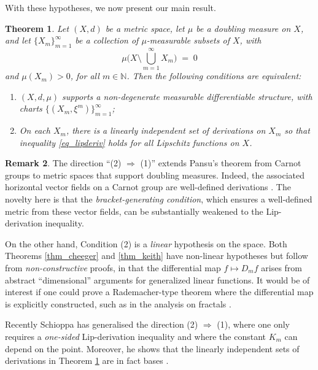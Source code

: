\documentclass[reqno]{amsart}
\theoremstyle{plain}
\newtheorem{thm}{Theorem}[section]
\theoremstyle{definition}
\newtheorem{rmk}[thm]{Remark}
\theoremstyle{remark}
\numberwithin{equation}{section}
\newcommand{\N}{\mathbb{N}}
\begin{document}
With these hypotheses, we now present our main result.

\begin{thm} \label{thm_doublingdiff}
Let $(X,d)$ be a metric space, let $\mu$ be a doubling measure on $X$, and let $\{X_m\}_{m=1}^\infty$ be a collection of $\mu$-measurable subsets of $X$, with
$$
\mu\Big( X \setminus \bigcup_{m=1}^\infty X_m \Big) \;=\; 0
$$
and $\mu(X_m) > 0$, for all $m \in \N$.
Then the following conditions are equivalent:
\begin{enumerate}
\item $(X,d,\mu)$ supports a non-degenerate measurable differentiable structure, with charts $\{(X_m,\xi^m)\}_{m=1}^\infty$;
\vspace{.025in}
\item On each $X_m$, there is a linearly independent set of derivations on $X_m$ 
so that 
inequality \eqref{eq_lipderiv} holds for all Lipschitz functions on $X$.
\end{enumerate}
\end{thm}

\begin{rmk}
The direction ``(2) $\Rightarrow$ (1)'' extends Pansu's theorem from Carnot groups to metric spaces that support doubling measures.  Indeed, the associated horizontal vector fields on a Carnot group are well-defined derivations \cite[Thm 39]{WeaverED}.  The novelty here is that the {\em bracket-generating condition}, which ensures a well-defined metric from these vector fields, can be substantially weakened to the Lip-derivation inequality.

On the other hand, Condition (2) is a {\em linear} hypothesis on the space.  Both Theorems \ref{thm_cheeger} and \ref{thm_keith} have non-linear hypotheses but follow from {\em non-constructive} proofs, in that the differential map $f \mapsto D_mf$ arises from abstract ``dimensional'' arguments for generalized linear functions.  It would be of interest if one could prove a Rademacher-type theorem where the differential map is explicitly constructed, such as in the analysis on fractals \cite{Kigami}.

Recently Schioppa \cite[Thm 5.9]{Schioppa} has generalised the direction (2) $\Rightarrow$ (1), where one only requires a {\em one-sided} Lip-derivation inequality and where the constant $K_m$ can depend on the point.  Moreover, he shows that the linearly independent sets of derivations in Theorem \ref{thm_doublingdiff} are in fact bases \cite[Cor 6.15]{Schioppa}. 
\end{rmk}
\end{document}
